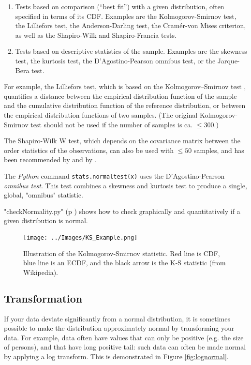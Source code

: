 \begin{enumerate}
  \item Tests based on comparison (“best fit”) with a given distribution, often specified in terms of its CDF. Examples are the Kolmogorov-Smirnov test, the Lilliefors test, the Anderson-Darling test, the Cramér-von Mises criterion, as well as the Shapiro-Wilk and Shapiro-Francia tests.
  \item Tests based on descriptive statistics of the sample. Examples are the skewness test, the kurtosis test, the D’Agostino-Pearson omnibus test, or the Jarque-Bera test.
\end{enumerate}

For example, the Lilliefors test, which is based on the Kolmogorov--Smirnov test , quantifies a distance between the empirical distribution function of the sample and the cumulative distribution function of the reference distribution, or between the empirical distribution functions of two samples. (The original Kolmogorov-Smirnov test should not be used if the number of samples is ca. $\leq 300$.)

The Shapiro-Wilk W test, which depends on the covariance matrix between the order statistics of the observations, can also be used with $\leq 50$ samples, and has been recommended by \cite{altman99} and by \cite{Ghasemi2012c}.

The \emph{Python} command \lstinline{stats.normaltest(x)} uses the D’Agostino-Pearson \emph{omnibus test}. This test combines a skewness and kurtosis test to produce a single, global, "omnibus" statistic.

\vspace{5 mm}

\PyImg "checkNormality.py" (p \pageref{py:checkNormality}) shows how to check graphically and quantitatively if a given distribution is normal.

\begin{figure}
  \centering
  \texttt{[image: ../Images/KS\_Example.png]}\\
  \caption{Illustration of the Kolmogorov-Smirnov statistic. Red line is CDF, blue line is an ECDF, and the black arrow is the K-S statistic (from Wikipedia).}\label{fig:ksplot}
\end{figure}


\subsection{Transformation} 
If your data deviate significantly from a normal distribution, it is sometimes possible to make the distribution approximately normal by transforming your data. For example, data often have values that can only be positive (e.g. the size of persons), and that have  long positive tail: such data can often be made normal by applying a log transform. This is demonstrated in Figure \ref{fig:lognormal}.


